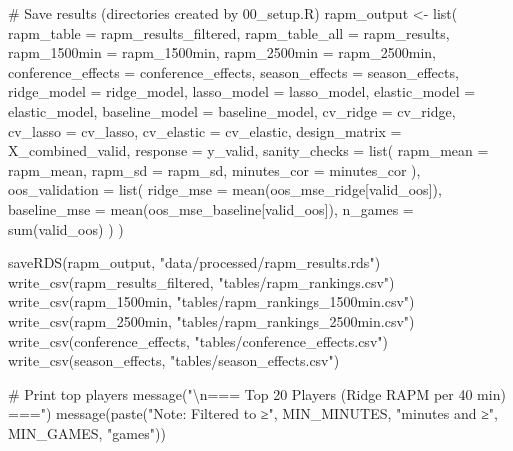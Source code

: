 \documentclass[
  letterpaper,
  DIV=11,
  numbers=noendperiod]{scrartcl}
\newenvironment{Shaded}{\begin{snugshade}}{\end{snugshade}}
\newcommand{\AttributeTok}[1]{\textcolor[rgb]{0.40,0.45,0.13}{#1}}
\newcommand{\CommentTok}[1]{\textcolor[rgb]{0.37,0.37,0.37}{#1}}
\newcommand{\FunctionTok}[1]{\textcolor[rgb]{0.28,0.35,0.67}{#1}}
\newcommand{\NormalTok}[1]{\textcolor[rgb]{0.00,0.23,0.31}{#1}}
\newcommand{\OtherTok}[1]{\textcolor[rgb]{0.00,0.23,0.31}{#1}}
\newcommand{\SpecialCharTok}[1]{\textcolor[rgb]{0.37,0.37,0.37}{#1}}
\newcommand{\StringTok}[1]{\textcolor[rgb]{0.13,0.47,0.30}{#1}}
\begin{document}
\begin{Shaded}
\begin{Highlighting}[]
\CommentTok{\# Save results (directories created by 00\_setup.R)}
\NormalTok{rapm\_output }\OtherTok{\textless{}{-}} \FunctionTok{list}\NormalTok{(}
  \AttributeTok{rapm\_table =}\NormalTok{ rapm\_results\_filtered,}
  \AttributeTok{rapm\_table\_all =}\NormalTok{ rapm\_results,}
  \AttributeTok{rapm\_1500min =}\NormalTok{ rapm\_1500min,}
  \AttributeTok{rapm\_2500min =}\NormalTok{ rapm\_2500min,}
  \AttributeTok{conference\_effects =}\NormalTok{ conference\_effects,}
  \AttributeTok{season\_effects =}\NormalTok{ season\_effects,}
  \AttributeTok{ridge\_model =}\NormalTok{ ridge\_model,}
  \AttributeTok{lasso\_model =}\NormalTok{ lasso\_model,}
  \AttributeTok{elastic\_model =}\NormalTok{ elastic\_model,}
  \AttributeTok{baseline\_model =}\NormalTok{ baseline\_model,}
  \AttributeTok{cv\_ridge =}\NormalTok{ cv\_ridge,}
  \AttributeTok{cv\_lasso =}\NormalTok{ cv\_lasso,}
  \AttributeTok{cv\_elastic =}\NormalTok{ cv\_elastic,}
  \AttributeTok{design\_matrix =}\NormalTok{ X\_combined\_valid,}
  \AttributeTok{response =}\NormalTok{ y\_valid,}
  \AttributeTok{sanity\_checks =} \FunctionTok{list}\NormalTok{(}
    \AttributeTok{rapm\_mean =}\NormalTok{ rapm\_mean,}
    \AttributeTok{rapm\_sd =}\NormalTok{ rapm\_sd,}
    \AttributeTok{minutes\_cor =}\NormalTok{ minutes\_cor}
\NormalTok{  ),}
  \AttributeTok{oos\_validation =} \FunctionTok{list}\NormalTok{(}
    \AttributeTok{ridge\_mse =} \FunctionTok{mean}\NormalTok{(oos\_mse\_ridge[valid\_oos]),}
    \AttributeTok{baseline\_mse =} \FunctionTok{mean}\NormalTok{(oos\_mse\_baseline[valid\_oos]),}
    \AttributeTok{n\_games =} \FunctionTok{sum}\NormalTok{(valid\_oos)}
\NormalTok{  )}
\NormalTok{)}

\FunctionTok{saveRDS}\NormalTok{(rapm\_output, }\StringTok{"data/processed/rapm\_results.rds"}\NormalTok{)}
\FunctionTok{write\_csv}\NormalTok{(rapm\_results\_filtered, }\StringTok{"tables/rapm\_rankings.csv"}\NormalTok{)}
\FunctionTok{write\_csv}\NormalTok{(rapm\_1500min, }\StringTok{"tables/rapm\_rankings\_1500min.csv"}\NormalTok{)}
\FunctionTok{write\_csv}\NormalTok{(rapm\_2500min, }\StringTok{"tables/rapm\_rankings\_2500min.csv"}\NormalTok{)}
\FunctionTok{write\_csv}\NormalTok{(conference\_effects, }\StringTok{"tables/conference\_effects.csv"}\NormalTok{)}
\FunctionTok{write\_csv}\NormalTok{(season\_effects, }\StringTok{"tables/season\_effects.csv"}\NormalTok{)}

\CommentTok{\# Print top players}
\FunctionTok{message}\NormalTok{(}\StringTok{"}\SpecialCharTok{\textbackslash{}n}\StringTok{=== Top 20 Players (Ridge RAPM per 40 min) ==="}\NormalTok{)}
\FunctionTok{message}\NormalTok{(}\FunctionTok{paste}\NormalTok{(}\StringTok{"Note: Filtered to ≥"}\NormalTok{, MIN\_MINUTES, }\StringTok{"minutes and ≥"}\NormalTok{, MIN\_GAMES, }\StringTok{"games"}\NormalTok{))}


\end{Highlighting}
\end{Shaded}
\end{document}
